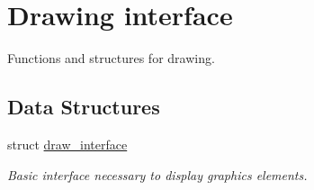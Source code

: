 \hypertarget{group__drawing}{}\section{Drawing interface}
\label{group__drawing}


Functions and structures for drawing.  


\subsection*{Data Structures}
\begin{DoxyCompactItemize}
\item 
struct \hyperlink{structdraw__interface}{draw\+\_\+interface}
\begin{DoxyCompactList}\small\item\em Basic interface necessary to display graphics elements. \end{DoxyCompactList}\end{DoxyCompactItemize}
